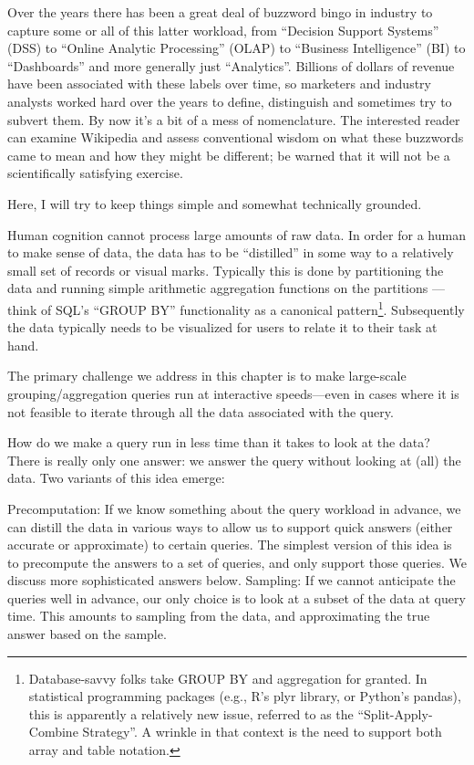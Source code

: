 \documentclass[b5paper,11pt,twoside,openright]{book}
\begin{document}
Over the years there has been a great deal of buzzword bingo in industry
to capture some or all of this latter workload, from ``Decision Support
Systems'' (DSS) to ``Online Analytic Processing'' (OLAP) to ``Business
Intelligence'' (BI) to ``Dashboards'' and more generally just
``Analytics''. Billions of dollars of revenue have been associated with
these labels over time, so marketers and industry analysts worked hard
over the years to define, distinguish and sometimes try to subvert them.
By now it's a bit of a mess of nomenclature. The interested reader can
examine Wikipedia and assess conventional wisdom on what these buzzwords
came to mean and how they might be different; be warned that it will not
be a scientifically satisfying exercise.

Here, I will try to keep things simple and somewhat technically
grounded.

Human cognition cannot process large amounts of raw data. In order for a
human to make sense of data, the data has to be ``distilled'' in some
way to a relatively small set of records or visual marks. Typically this
is done by partitioning the data and running simple arithmetic
aggregation functions on the partitions --- think of SQL's ``GROUP BY''
functionality as a canonical
pattern\footnote{Database-savvy folks take GROUP BY and aggregation for granted. In
  statistical programming packages (e.g., R's plyr library, or Python's
  pandas), this is apparently a relatively new issue, referred to as the
  ``Split-Apply-Combine Strategy''. A wrinkle in that context is the
  need to support both array and table
  notation.}. Subsequently the
data typically needs to be visualized for users to relate it to their
task at hand.

The primary challenge we address in this chapter is to make large-scale
grouping/aggregation queries run at interactive speeds---even in cases
where it is not feasible to iterate through all the data associated with
the query.

How do we make a query run in less time than it takes to look at the
data? There is really only one answer: we answer the query without
looking at (all) the data. Two variants of this idea emerge:

Precomputation: If we know something about the query workload in
advance, we can distill the data in various ways to allow us to support
quick answers (either accurate or approximate) to certain queries. The
simplest version of this idea is to precompute the answers to a set of
queries, and only support those queries. We discuss more sophisticated
answers below. Sampling: If we cannot anticipate the queries well in
advance, our only choice is to look at a subset of the data at query
time. This amounts to sampling from the data, and approximating the true
answer based on the sample.
\end{document}
